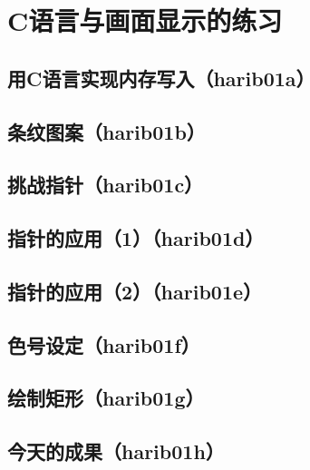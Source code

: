 ﻿\chapter{	C语言与画面显示的练习	}
\section{	用C语言实现内存写入（harib01a）	}
\section{	条纹图案（harib01b）	}
\section{	挑战指针（harib01c）	}
\section{	指针的应用（1）（harib01d）	}
\section{	指针的应用（2）（harib01e）	}
\section{	色号设定（harib01f）	}
\section{	绘制矩形（harib01g）	}
\section{	今天的成果（harib01h）	}

